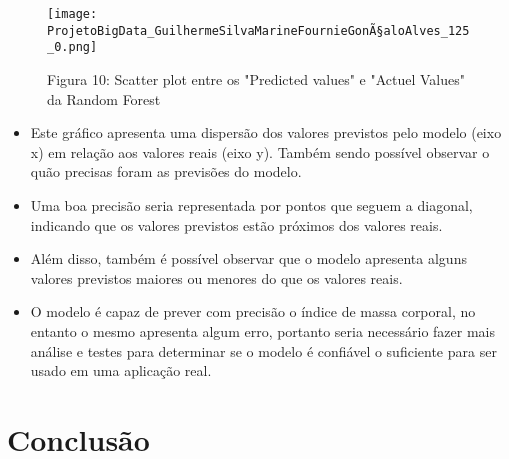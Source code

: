 \documentclass[11pt]{article}
\providecommand{\tightlist}{%
      \setlength{\itemsep}{0pt}\setlength{\parskip}{0pt}}
\begin{document}
\begin{figure}[h]
   \centering
   \texttt{[image: ProjetoBigData\_GuilhermeSilvaMarineFournieGonÃ§aloAlves\_125\_0.png]}
   \pagebreak
    \caption{Figura 10: Scatter plot entre os "Predicted values" e "Actuel Values" da Random Forest}
    \pagebreak
   \label{fig:scatterPlot2}
\end{figure}
    
    \begin{itemize}
\tightlist
\item
  Este gráfico apresenta uma dispersão dos valores previstos pelo modelo
  (eixo x) em relação aos valores reais (eixo y). Também sendo possível
  observar o quão precisas foram as previsões do modelo.
\item
  Uma boa precisão seria representada por pontos que seguem a diagonal,
  indicando que os valores previstos estão próximos dos valores reais.
\item
  Além disso, também é possível observar que o modelo apresenta alguns
  valores previstos maiores ou menores do que os valores reais.
\item
  O modelo é capaz de prever com precisão o índice de massa corporal, no
  entanto o mesmo apresenta algum erro, portanto seria necessário fazer
  mais análise e testes para determinar se o modelo é confiável o
  suficiente para ser usado em uma aplicação real.
\end{itemize}

    \hypertarget{conclusuxe3o}{%
\section{Conclusão}\label{conclusuxe3o}}
\end{document}
